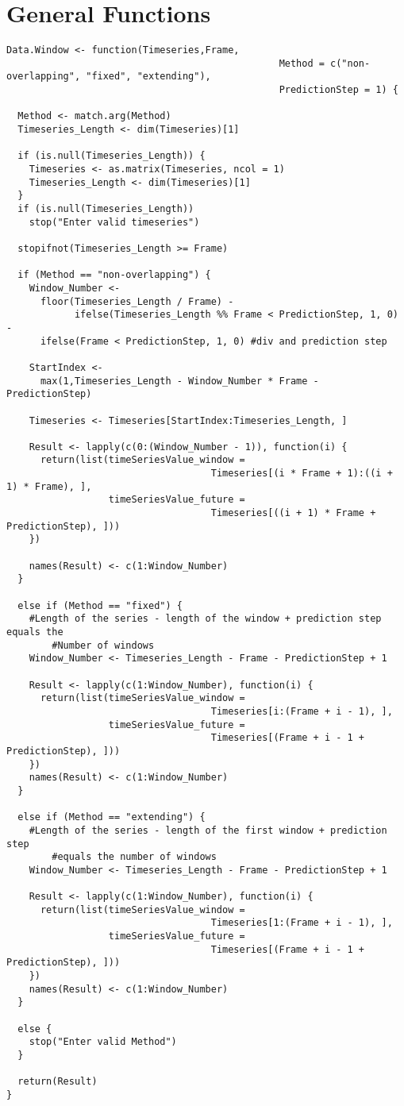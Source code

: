 \section{General Functions}
\label{sec:General Functions}

\begin{verbatim}
Data.Window <- function(Timeseries,Frame,
												Method = c("non-overlapping", "fixed", "extending"),
												PredictionStep = 1) {
  
  Method <- match.arg(Method)
  Timeseries_Length <- dim(Timeseries)[1]
  
  if (is.null(Timeseries_Length)) {
    Timeseries <- as.matrix(Timeseries, ncol = 1)
    Timeseries_Length <- dim(Timeseries)[1]
  }
  if (is.null(Timeseries_Length))
    stop("Enter valid timeseries")
  
  stopifnot(Timeseries_Length >= Frame)
  
  if (Method == "non-overlapping") {
    Window_Number <-
      floor(Timeseries_Length / Frame) - 
			ifelse(Timeseries_Length %% Frame < PredictionStep, 1, 0) - 
      ifelse(Frame < PredictionStep, 1, 0) #div and prediction step
    
    StartIndex <-
      max(1,Timeseries_Length - Window_Number * Frame - PredictionStep)
    
    Timeseries <- Timeseries[StartIndex:Timeseries_Length, ]
    
    Result <- lapply(c(0:(Window_Number - 1)), function(i) {
      return(list(timeSeriesValue_window = 
									Timeseries[(i * Frame + 1):((i + 1) * Frame), ],
                  timeSeriesValue_future = 
									Timeseries[((i + 1) * Frame + PredictionStep), ]))
    })
    
    names(Result) <- c(1:Window_Number)
  }
  
  else if (Method == "fixed") {
    #Length of the series - length of the window + prediction step equals the 
		#Number of windows
    Window_Number <- Timeseries_Length - Frame - PredictionStep + 1
    
    Result <- lapply(c(1:Window_Number), function(i) {
      return(list(timeSeriesValue_window = 
									Timeseries[i:(Frame + i - 1), ],
                  timeSeriesValue_future = 
									Timeseries[(Frame + i - 1 + PredictionStep), ]))
    })
    names(Result) <- c(1:Window_Number)
  }
  
  else if (Method == "extending") {
    #Length of the series - length of the first window + prediction step 
		#equals the number of windows
    Window_Number <- Timeseries_Length - Frame - PredictionStep + 1
    
    Result <- lapply(c(1:Window_Number), function(i) {
      return(list(timeSeriesValue_window = 
									Timeseries[1:(Frame + i - 1), ],
                  timeSeriesValue_future = 
									Timeseries[(Frame + i - 1 + PredictionStep), ]))
    })
    names(Result) <- c(1:Window_Number)
  }
  
  else {
    stop("Enter valid Method")
  }
  
  return(Result)
}
\end{verbatim}



